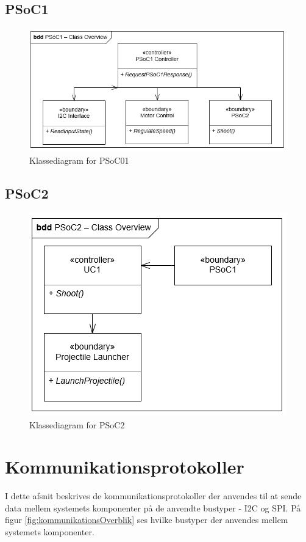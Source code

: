 \subsection{PSoC1}
\begin{figure}[H]
	\centering
	\includegraphics[width=\textwidth]{Systemarkitektur/images/classOverviewPSoC1}
	\caption{Klassediagram for PSoC01}
	\label{fig:OverallKlassePSoC1}
\end{figure}

\subsection{PSoC2}
\begin{figure}[H]
	\centering
	\includegraphics[width=\textwidth]{Systemarkitektur/images/classOverviewPSoC2}
	\caption{Klassediagram for PSoC2}
	\label{fig:OverallKlassePSoC2}
\end{figure}

\section{Kommunikationsprotokoller}
\label{afsnit:kommunikationsprotokoller}
I dette afsnit beskrives de kommunikationsprotokoller der anvendes til at sende data mellem systemets komponenter på de anvendte bustyper - I2C og SPI. På figur \ref{fig:kommunikationsOverblik} ses hvilke bustyper der anvendes mellem systemets komponenter. 

